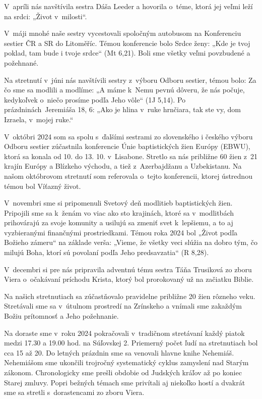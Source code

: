 V~apríli nás navštívila sestra Dáša Leeder a hovorila o~téme, ktorá jej veľmi leží na srdci: „Život v~milosti“.

V~máji mnohé naše sestry vycestovali spoločným autobusom na Konferenciu sestier ČR a SR do Litoměříc. Témou konferencie bolo Srdce ženy: „Kde je tvoj poklad, tam bude i tvoje srdce“ (Mt 6,21). Boli sme všetky veľmi povzbudené a požehnané.

Na stretnutí v~júni nás navštívili sestry z~výboru Odboru sestier, témou bolo: Za čo sme sa modlili a modlíme: „A máme k~Nemu pevnú dôveru, že nás počuje, kedykoľvek o~niečo prosíme podľa Jeho vôle“ (1J 5,14).
Po prázdninách~Jeremiáša 18, 6: „Ako je hlina v~ruke hrnčiara, tak ste vy, dom Izraela, v~mojej ruke.“

V~októbri 2024 som sa spolu s~ďalšími sestrami zo slovenského i českého výboru Odboru sestier zúčastnila konferencie Únie baptistických žien Európy (EBWU), ktorá sa konala od 10. do 13. 10. v~Lisabone. Stretlo sa nás približne 60 žien z~21 krajín Európy a Blízkeho východu, a tiež z~Azerbajdžanu a Uzbekistanu. Na našom októbrovom stretnutí som referovala o~tejto konferencii, ktorej ústrednou témou bol Víťazný život.

V~novembri sme si pripomenuli Svetový deň modlitieb baptistických žien. Pripojili sme sa k~ženám vo viac ako sto krajinách, ktoré sa v~modlitbách prihovárajú za svoje komunity a usilujú sa zmeniť svet k~lepšiemu, a to aj vyzbieranými finančnými prostriedkami. Témou roka 2024 bol „Život podľa Božieho zámeru“ na základe verša: „Vieme, že všetky veci slúžia na dobro tým, čo milujú Boha, ktorí sú povolaní podľa Jeho predsavzatia“ (R 8,28).

V~decembri si pre nás pripravila adventnú tému sestra Táňa Trusiková zo zboru Viera o~očakávaní príchodu Krista, ktorý bol prorokovaný už na začiatku Biblie.

Na našich stretnutiach sa zúčastňovalo pravidelne približne 20 žien rôzneho veku. Stretávali sme sa v~útulnom prostredí na Zrínskeho a vnímali sme zakaždým Božiu prítomnosť a Jeho požehnanie.

\vfill\break



Na doraste sme v~roku 2024 pokračovali v~tradičnom stretávaní každý piatok medzi 17.30 a 19.00 hod. na Súľovskej 2. Priemerný počet ľudí na stretnutiach bol cca 15 až 20. Do letných prázdnin sme sa venovali hlavne knihe Nehemiáš. Nehemiášom sme ukončili trojročný systematický cyklus zamyslení nad Starým zákonom. Chronologicky sme prešli obdobie od Judských kráľov až po koniec Starej zmluvy. Popri bežných témach sme privítali aj niekoľko hostí a dvakrát sme sa stretli s~dorastencami zo zboru Viera.

